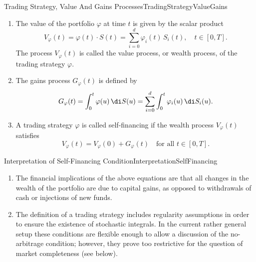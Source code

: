 \begin{defn}{Trading Strategy, Value And Gains Processes}{TradingStrategyValueGains}
	\begin{enumerate}[label=(\roman*)]
		\item The value of the portfolio \(\varphi\) at time \(t\) is given by the scalar product
		      \begin{equation}\label{eq:ValueOfPortfolio}
			      V_{\varphi}(t) = \varphi(t) \cdot S(t) = \sum_{i=0}^{d} \varphi_i(t)\,S_i(t), \quad t \in [0,T].
		      \end{equation}
		      The process \(V_{\varphi}(t)\) is called the value process, or wealth process, of the trading strategy \(\varphi\).
		\item The gains process \(G_{\varphi}(t)\) is defined by
		      \begin{equation}\label{eq:GainsProcess}
			      G_{\varphi}(t) = \int_{0}^{t} \varphi(u)\,\di S(u) = \sum_{i=0}^{d} \int_{0}^{t} \varphi_i(u)\,\di S_i(u).
		      \end{equation}
		\item A trading strategy \(\varphi\) is called self-financing if the wealth process \(V_{\varphi}(t)\) satisfies
		      \begin{equation}\label{eq:SelfFinancingCondition}
			      V_{\varphi}(t) = V_{\varphi}(0) + G_{\varphi}(t) \quad \text{for all } t \in [0,T].
		      \end{equation}
	\end{enumerate}
\end{defn}

\begin{xtip}{Interpretation of Self-Financing Condition}{InterpretationSelfFinancing}
	\begin{enumerate}[label=(\roman*)]
		\item The financial implications of the above equations are that all changes in the wealth of the portfolio are due to capital gains, as opposed to withdrawals of cash or injections of new funds.
		\item The definition of a trading strategy includes regularity assumptions in order to ensure the existence of stochastic integrals. In the current rather general setup these conditions are flexible enough to allow a discussion of the no-arbitrage condition; however, they prove too restrictive for the question of market completeness (see below).
	\end{enumerate}
\end{xtip}

